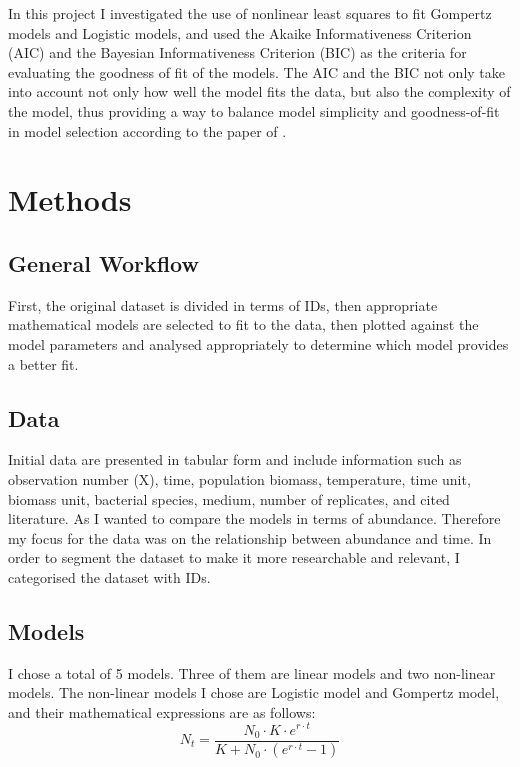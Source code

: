 \documentclass[11pt]{article}
\begin{document}
In this project I investigated the use of nonlinear least squares to fit Gompertz models\cite{zwietering1990modelling} and Logistic models, and used the Akaike Informativeness Criterion (AIC) and the Bayesian Informativeness Criterion (BIC) as the criteria for evaluating the goodness of fit of the models. The AIC and the BIC not only take into account not only how well the model fits the data, but also the complexity of the model, thus providing a way to balance model simplicity and goodness-of-fit in model selection according to the paper of \cite{johnson2004model}.


\section{Methods}
\subsection{General Workflow}
First, the original dataset is divided in terms of IDs, then appropriate mathematical models are selected to fit to the data, then plotted against the model parameters and analysed appropriately to determine which model provides a better fit.

\subsection{Data}
Initial data are presented in tabular form and include information such as observation number (X), time, population biomass, temperature, time unit, biomass unit, bacterial species, medium, number of replicates, and cited literature. As I wanted to compare the models in terms of abundance. Therefore my focus for the data was on the relationship between abundance and time. In order to segment the dataset to make it more researchable and relevant, I categorised the dataset with IDs.

\subsection{Models}
I chose a total of 5 models. Three of them are linear models and two non-linear models. The non-linear models I chose are Logistic model and Gompertz model, and their mathematical expressions are as follows: \\
\begin{equation}
N_t = \frac{N_0 \cdot K \cdot e^{r \cdot t}}{K + N_0 \cdot (e^{r \cdot t} - 1)}
\end{equation}
\end{document}
